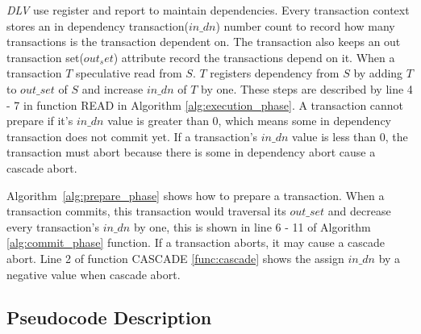 \documentclass[conference]{IEEEtran}
\begin{document}
\emph{DLV} use register and report\cite{HeckatonMVCC:journals/pvldb/LarsonBDFPZ11} to maintain dependencies.
Every transaction context stores an in dependency transaction(${in\_dn}$) number count to record how many transactions is the transaction dependent on.
The transaction also keeps an out transaction set(${out_set}$) attribute record the transactions depend on it.
When a transaction ${T}$ speculative read from ${S}$.
${T}$ registers dependency from ${S}$ by adding ${T}$ to ${out\_set}$ of ${S}$ and increase ${in\_dn}$ of ${T}$ by one.
These steps are described by line 4 - 7 in function READ in Algorithm \ref{alg:execution_phase}.
A transaction cannot prepare if it's ${in\_dn}$ value is greater than 0, which means some in dependency transaction does not commit yet.
If a transaction's ${in\_dn}$ value is less than 0, the transaction must abort because there is some in dependency abort cause a cascade abort.

Algorithm~\ref{alg:prepare_phase} shows how to prepare a transaction.
When a transaction commits, this transaction would traversal its ${out\_set}$ and decrease every transaction's ${in\_dn}$ by one, this is shown in line 6 - 11 of Algorithm \ref{alg:commit_phase} function.
If a transaction aborts, it may cause a cascade abort.
Line 2 of function CASCADE \ref{func:cascade} shows the assign ${in\_dn}$ by a negative value when cascade abort.

\subsection{Pseudocode Description}
\end{document}
